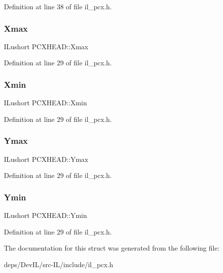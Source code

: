 Definition at line 38 of file il\+\_\+pcx.\+h.

\mbox{\label{structPCXHEAD_a2c77ccf0d6c09f571d63e9161af27e21}} 
\subsubsection{\texorpdfstring{Xmax}{Xmax}}
{\footnotesize\ttfamily I\+Lushort P\+C\+X\+H\+E\+A\+D\+::\+Xmax}



Definition at line 29 of file il\+\_\+pcx.\+h.

\mbox{\label{structPCXHEAD_a005597a657a1a1f8d0655104bf5e4934}} 
\subsubsection{\texorpdfstring{Xmin}{Xmin}}
{\footnotesize\ttfamily I\+Lushort P\+C\+X\+H\+E\+A\+D\+::\+Xmin}



Definition at line 29 of file il\+\_\+pcx.\+h.

\mbox{\label{structPCXHEAD_a9a8574681fe6b34c01ca7f3693a66172}} 
\subsubsection{\texorpdfstring{Ymax}{Ymax}}
{\footnotesize\ttfamily I\+Lushort P\+C\+X\+H\+E\+A\+D\+::\+Ymax}



Definition at line 29 of file il\+\_\+pcx.\+h.

\mbox{\label{structPCXHEAD_a5a34faa1624922ed3811f5e4424e3961}} 
\subsubsection{\texorpdfstring{Ymin}{Ymin}}
{\footnotesize\ttfamily I\+Lushort P\+C\+X\+H\+E\+A\+D\+::\+Ymin}



Definition at line 29 of file il\+\_\+pcx.\+h.



The documentation for this struct was generated from the following file\+:\begin{DoxyCompactItemize}
\item 
deps/\+Dev\+I\+L/src-\/\+I\+L/include/il\+\_\+pcx.\+h\end{DoxyCompactItemize}

